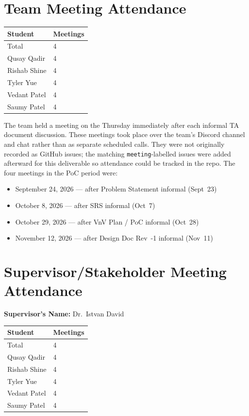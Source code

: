 \documentclass{article}
\begin{document}
\section{Team Meeting Attendance}

\begin{table}[H]
\centering
\begin{tabular}{ll}
\toprule
\textbf{Student} & \textbf{Meetings}\\
\midrule
Total & 4\\
Qusay Qadir & 4\\
Rishab Shine & 4\\
Tyler Yue & 4\\
Vedant Patel & 4\\
Saumy Patel & 4\\
\bottomrule
\end{tabular}
\end{table}

The team held a meeting on the Thursday immediately after each informal TA
document discussion. These meetings took place over the team's Discord channel
and chat rather than as separate scheduled calls. They were not originally
recorded as GitHub issues; the matching \texttt{meeting}-labelled issues were
added afterward for this deliverable so attendance could be tracked in the
repo. The four meetings in the PoC period were:

\begin{itemize}
  \item September 24, 2026 --- after Problem Statement informal (Sept~23)
  \item October 8, 2026 --- after SRS informal (Oct~7)
  \item October 29, 2026 --- after VnV Plan / PoC informal (Oct~28)
  \item November 12, 2026 --- after Design Doc Rev~-1 informal (Nov~11)
\end{itemize}

\section{Supervisor/Stakeholder Meeting Attendance}

\noindent \textbf{Supervisor's Name: } Dr.\ Istvan David

\begin{table}[H]
\centering
\begin{tabular}{ll}
\toprule
\textbf{Student} & \textbf{Meetings}\\
\midrule
Total & 4\\
Qusay Qadir & 4\\
Rishab Shine & 4\\
Tyler Yue & 4\\
Vedant Patel & 4\\
Saumy Patel & 4\\
\bottomrule
\end{tabular}
\end{table}
\end{document}
